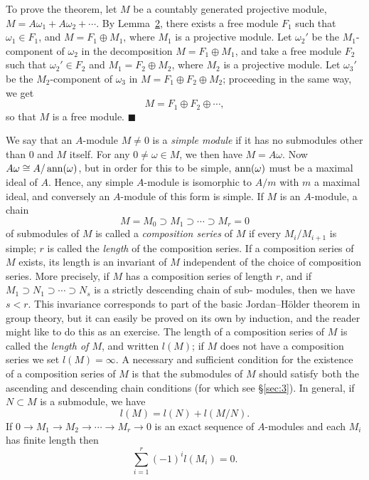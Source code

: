 To prove the theorem, let $M$ be a countably generated projective module,
$M = A\omega_1 + A\omega_2 + \cdots$. By Lemma~\hyperref[lem:2.2]{2}, there exists a free module $F_1$ such that
$\omega_1 \in F_1$, and $M = F_1 \oplus M_1$, where $M_1$ is a projective module. Let $\omega_2'$
be the $M_1$-component of $\omega_2$ in the decomposition $M = F_1 \oplus M_1$, and take
a free module $F_2$ such that $\omega_2' \in F_2$ and $M_1 = F_2 \oplus M_2$, where $M_2$ is a
projective module. Let $\omega_3'$ be the $M_2$-component of $\omega_3$ in $M = F_1 \oplus F_2 \oplus M_2$;
proceeding in the same way, we get
\[
  M = F_1 \oplus F_2 \oplus \cdots,
\]
so that $M$ is a free module. $\blacksquare$

We say that an $A$-module $M \neq 0$ is a \emph{simple module} if it has no
submodules other than $0$ and $M$ itself. For any $0 \neq \omega \in M$, we then have
$M = A\omega$. Now $A\omega \cong A/\operatorname{ann}(\omega)$, but in order for this to be simple, $\operatorname{ann}(\omega)$
must be a maximal ideal of $A$. Hence, any simple $A$-module is isomorphic
to $A/m$ with $m$ a maximal ideal, and conversely an $A$-module of this form
is simple. If $M$ is an $A$-module, a chain
\[
  M = M_0 \supset M_1 \supset \cdots \supset M_r = 0
\]
of submodules of $M$ is called a \emph{composition series} of $M$ if every $M_i/M_{i+1}$ is
simple; $r$ is called the \emph{length} of the composition series. If a composition series
of $M$ exists, its length is an invariant of $M$ independent of the choice of
composition series. More precisely, if $M$ has a composition series of length
$r$, and if $M_1 \supset N_1 \supset \cdots \supset N_s$ is a strictly descending chain of sub-
modules, then we have $s < r$. This invariance corresponds to part of the
basic Jordan--H\"older theorem in group theory, but it can easily be proved
on its own by induction, and the reader might like to do this as an exercise.
The length of a composition series of $M$ is called the \emph{length of $M$}, and written
$l(M)$; if $M$ does not have a composition series we set $l(M) = \infty$. A necessary
and sufficient condition for the existence of a composition series of $M$ is that
the submodules of $M$ should satisfy both the ascending and descending
chain conditions (for which see \S\ref{sec:3}). In general, if $N \subset M$ is a submodule,
we have
\[
  l(M) = l(N) + l(M/N).
\]
If $0 \to M_1 \to M_2 \to \cdots \to M_r \to 0$ is an exact sequence of $A$-modules and
each $M_i$ has finite length then
\[
  \sum_{i=1}^{r} (-1)^i l(M_i) = 0.
\]

